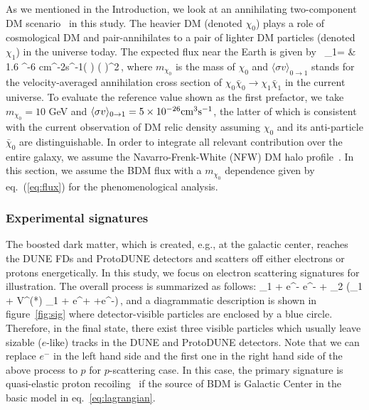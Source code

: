 As we mentioned in the Introduction, we look at an annihilating two-component DM scenario~\cite{Belanger:2011ww} in this study. 
The heavier DM (denoted $\chi_0$) plays a role of cosmological DM and pair-annihilates to a pair of lighter DM particles (denoted $\chi_1$) in the universe today. 
The expected flux near the Earth is given by~\cite{Agashe:2014yua, Giudice:2017zke, Kim:2018veo}
\bea 
{}_1= & 1.6 ^{-6} {\rm cm}^{-2}{\rm s}^{-1}\times \left( \right) 
 \times \left( \right)^2\,,
\label{eq:flux}
\eea
where $m_{\chi_0}$ is the mass of $\chi_0$ and $\langle \sigma v\rangle_{0\rightarrow 1}$ stands for the velocity-averaged annihilation cross section of $\chi_0\bar{\chi}_0 \to \chi_1\bar{\chi}_1$ in the current universe.
To evaluate the reference value shown as the first prefactor, we take $m_{\chi_0} = 10$ GeV and $\langle \sigma v\rangle_{0\rightarrow 1}=5\times 10^{-26}{\rm cm}^3{\rm s}^{-1}$, the latter of which is consistent with the current observation of DM relic density assuming $\chi_0$ and its anti-particle $\bar{\chi}_0$ are distinguishable. 
In order to integrate all relevant contribution over the entire galaxy, we assume the Navarro-Frenk-White (NFW) DM halo profile~\cite{Navarro:1995iw, Navarro:1996gj}.
In this section, we assume the BDM flux with a $m_{\chi_0}$ dependence given by eq.~(\ref{eq:flux}) for the phenomenological analysis. 


\subsubsection{Experimental signatures}

The boosted dark matter, which is created, e.g., at the galactic center, reaches the DUNE FDs and ProtoDUNE detectors and scatters off either electrons or protons energetically. 
In this study, we focus on electron scattering signatures for illustration. 
The overall process is summarized as follows:
\bea 
\chi_1 + e^- \to e^- + \chi_2 (\to \chi_1 + V^{(*)} \to \chi_1 + e^+ +e^-)\,,
\eea
and a diagrammatic description is shown in figure~\ref{fig:sig} where detector-visible particles are enclosed by a blue circle. 
Therefore, in the final state, there exist three visible particles which usually leave sizable ($e$-like) tracks in the DUNE and ProtoDUNE detectors.  
Note that we can replace $e^-$ in the left hand side and the first one in the right hand side of the above process to $p$ for $p$-scattering case.
In this case, the primary signature is quasi-elastic proton recoiling~\cite{pscattering} if the source of BDM is Galactic Center in the basic model in eq.~\eqref{eq:lagrangian}.

